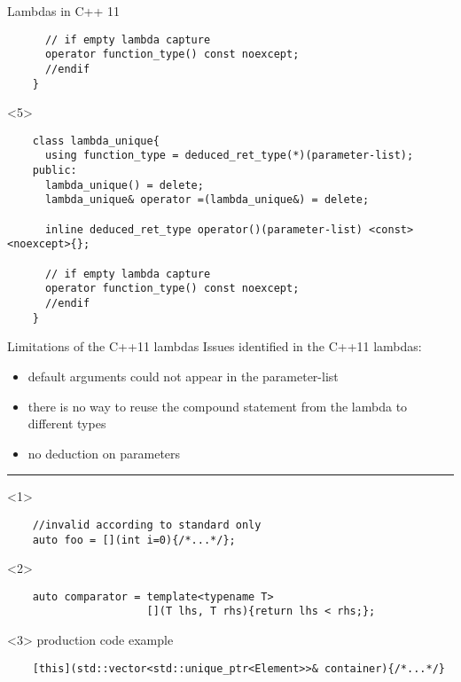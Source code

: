 \documentclass[10pt]{beamer}
\begin{document}
\begin{frame}[fragile]{Lambdas in C++ 11}
\begin{onlyenv}
\begin{verbatim}
	  // if empty lambda capture
	  operator function_type() const noexcept;
	  //endif
	}
	\end{verbatim}
	\end{onlyenv}

	\begin{onlyenv}
	\begin{verbatim}
	class lambda_unique{
	  using function_type = deduced_ret_type(*)(parameter-list); 
	public:
	  lambda_unique() = delete;
	  lambda_unique& operator =(lambda_unique&) = delete;

	  inline deduced_ret_type operator()(parameter-list) <const> <noexcept>{};
		
	  // if empty lambda capture
	  operator function_type() const noexcept;
	  //endif
	}
	\end{verbatim}
	\end{onlyenv}

\end{frame}

\begin{frame}[fragile]{Limitations of the C++11 lambdas}
	Issues identified in the C++11 lambdas:

	\begin{itemize}[<+- |alert@+>]
		\item default arguments could not appear in the parameter-list
		\item there is no way to reuse the compound statement from the lambda to different types
		\item no deduction on parameters
	\end{itemize}

	\hrule
	\vfill

	\begin{onlyenv}
	\begin{verbatim}
	//invalid according to standard only
	auto foo = [](int i=0){/*...*/};
	\end{verbatim}
	
	\end{onlyenv}

	\begin{onlyenv}
	\begin{verbatim}
	auto comparator = template<typename T>
	                  [](T lhs, T rhs){return lhs < rhs;};
	\end{verbatim}
	
	\end{onlyenv}

	\begin{onlyenv}
	\centering production code example
	\begin{verbatim}
	[this](std::vector<std::unique_ptr<Element>>& container){/*...*/}
	\end{verbatim}
	
	\end{onlyenv}

\end{frame}
\end{document}

